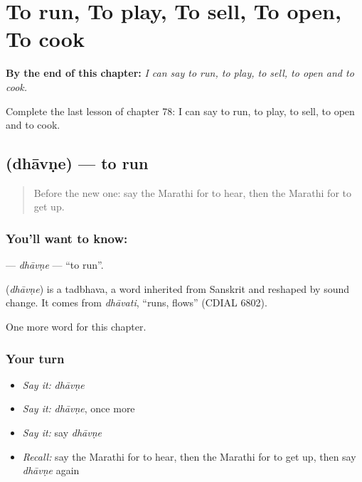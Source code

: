 
\chapter{To run, To play, To sell, To open, To cook}
\label{ch:mr-to-run-to-play-to-sell-to-open-to-cook}

\begin{chapteropening}
\textbf{By the end of this chapter:} \emph{I can say to run, to play, to sell, to open and to cook.}

Complete the last lesson of chapter 78: I can say to run, to play, to sell, to open and to cook.
\end{chapteropening}

\section[\texorpdfstring{\mr{धावणे} (dhāvṇe)}{धावणे (dhāvṇe)}]{ (dhāvṇe) — to run}

\label{lesson:MR-C78-dhavne}



\begin{quote}
Before the new one: say the Marathi for to hear, then the Marathi for to get up.
\end{quote}

\subsection*{You'll want to know: }
\textbf{} — \emph{dhāvṇe} — \textquotedblleft{}to run\textquotedblright{}.

\begin{cousinweb}
\textbf{} (\emph{dhāvṇe}) is a tadbhava, a word inherited from Sanskrit and reshaped by sound change. It comes from \emph{dhāvati}, \textquotedblleft{}runs, flows\textquotedblright{} (CDIAL 6802).
\end{cousinweb}

\begin{grammarlens}[title={What you've built}]
One more word for this chapter.
\end{grammarlens}

\subsection*{Your turn}
\begin{itemize}
\raggedright
  \item \emph{Say it:} \emph{dhāvṇe}
  \item \emph{Say it:} \emph{dhāvṇe}, once more
  \item \emph{Say it:} say \emph{dhāvṇe}
  \item \emph{Recall:} say the Marathi for to hear, then the Marathi for to get up, then say \emph{dhāvṇe} again
\end{itemize}

